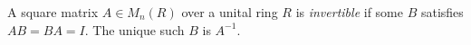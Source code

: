 
A square matrix $A\in M_n(R)$ over a unital ring $R$ is \emph{invertible} if some $B$ satisfies $AB=BA=I$. The unique such $B$ is $A^{-1}$.
